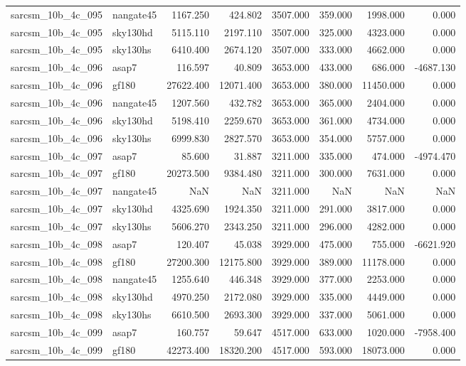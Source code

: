 \begin{tabular}{llrrrrrr}
sarcsm\_10b\_4c\_095 & nangate45 & 1167.250 & 424.802 & 3507.000 & 359.000 & 1998.000 & 0.000 \\
sarcsm\_10b\_4c\_095 & sky130hd & 5115.110 & 2197.110 & 3507.000 & 325.000 & 4323.000 & 0.000 \\
sarcsm\_10b\_4c\_095 & sky130hs & 6410.400 & 2674.120 & 3507.000 & 333.000 & 4662.000 & 0.000 \\
sarcsm\_10b\_4c\_096 & asap7 & 116.597 & 40.809 & 3653.000 & 433.000 & 686.000 & -4687.130 \\
sarcsm\_10b\_4c\_096 & gf180 & 27622.400 & 12071.400 & 3653.000 & 380.000 & 11450.000 & 0.000 \\
sarcsm\_10b\_4c\_096 & nangate45 & 1207.560 & 432.782 & 3653.000 & 365.000 & 2404.000 & 0.000 \\
sarcsm\_10b\_4c\_096 & sky130hd & 5198.410 & 2259.670 & 3653.000 & 361.000 & 4734.000 & 0.000 \\
sarcsm\_10b\_4c\_096 & sky130hs & 6999.830 & 2827.570 & 3653.000 & 354.000 & 5757.000 & 0.000 \\
sarcsm\_10b\_4c\_097 & asap7 & 85.600 & 31.887 & 3211.000 & 335.000 & 474.000 & -4974.470 \\
sarcsm\_10b\_4c\_097 & gf180 & 20273.500 & 9384.480 & 3211.000 & 300.000 & 7631.000 & 0.000 \\
sarcsm\_10b\_4c\_097 & nangate45 & NaN & NaN & 3211.000 & NaN & NaN & NaN \\
sarcsm\_10b\_4c\_097 & sky130hd & 4325.690 & 1924.350 & 3211.000 & 291.000 & 3817.000 & 0.000 \\
sarcsm\_10b\_4c\_097 & sky130hs & 5606.270 & 2343.250 & 3211.000 & 296.000 & 4282.000 & 0.000 \\
sarcsm\_10b\_4c\_098 & asap7 & 120.407 & 45.038 & 3929.000 & 475.000 & 755.000 & -6621.920 \\
sarcsm\_10b\_4c\_098 & gf180 & 27200.300 & 12175.800 & 3929.000 & 389.000 & 11178.000 & 0.000 \\
sarcsm\_10b\_4c\_098 & nangate45 & 1255.640 & 446.348 & 3929.000 & 377.000 & 2253.000 & 0.000 \\
sarcsm\_10b\_4c\_098 & sky130hd & 4970.250 & 2172.080 & 3929.000 & 335.000 & 4449.000 & 0.000 \\
sarcsm\_10b\_4c\_098 & sky130hs & 6610.500 & 2693.300 & 3929.000 & 337.000 & 5061.000 & 0.000 \\
sarcsm\_10b\_4c\_099 & asap7 & 160.757 & 59.647 & 4517.000 & 633.000 & 1020.000 & -7958.400 \\
sarcsm\_10b\_4c\_099 & gf180 & 42273.400 & 18320.200 & 4517.000 & 593.000 & 18073.000 & 0.000 \\

\end{tabular}
